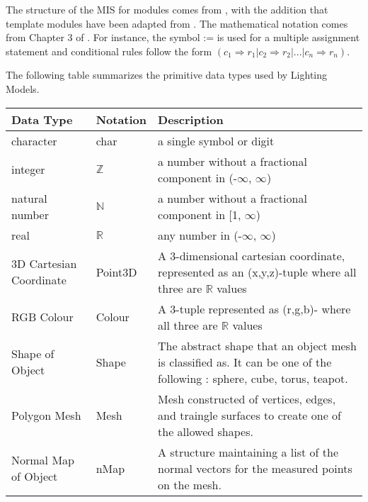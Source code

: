 \documentclass[12pt, titlepage]{article}
\newcommand{\progname}{Lighting Models}
\begin{document}

The structure of the MIS for modules comes from \citet{HoffmanAndStrooper1995},
with the addition that template modules have been adapted from
\cite{GhezziEtAl2003}.  The mathematical notation comes from Chapter 3 of
\citet{HoffmanAndStrooper1995}.  For instance, the symbol := is used for a
multiple assignment statement and conditional rules follow the form $(c_1
\Rightarrow r_1 | c_2 \Rightarrow r_2 | ... | c_n \Rightarrow r_n )$.

The following table summarizes the primitive data types used by \progname. 

\begin{center}
\renewcommand{\arraystretch}{1.2}
\noindent 
\begin{tabular}{l l p{7.5cm}} 
\toprule 
\textbf{Data Type} & \textbf{Notation} & \textbf{Description}\\ 
\midrule
character & char & a single symbol or digit\\
integer & $\mathbb{Z}$ & a number without a fractional component in (-$\infty$, $\infty$) \\
natural number & $\mathbb{N}$ & a number without a fractional component in [1, $\infty$) \\
real & $\mathbb{R}$ & any number in (-$\infty$, $\infty$)\\
3D Cartesian Coordinate & Point3D &  A 3-dimensional cartesian coordinate, 
represented as an (x,y,z)-tuple where all three are $\mathbb{R}$ values\\
RGB Colour & Colour &  A 3-tuple represented as (r,g,b)- where all three are 
$\mathbb{R}$ values\\
Shape of Object & Shape & The abstract shape that an object mesh is classified 
as. It can be one of the following : sphere, cube, torus, teapot. \\
Polygon Mesh & Mesh & Mesh constructed of vertices, edges, and traingle 
surfaces to create one of the allowed shapes.\\
Normal Map of Object & nMap & A structure maintaining a list of the normal 
vectors for the measured points on the mesh. \\
\bottomrule
\end{tabular} 
\end{center}

\end{document}
